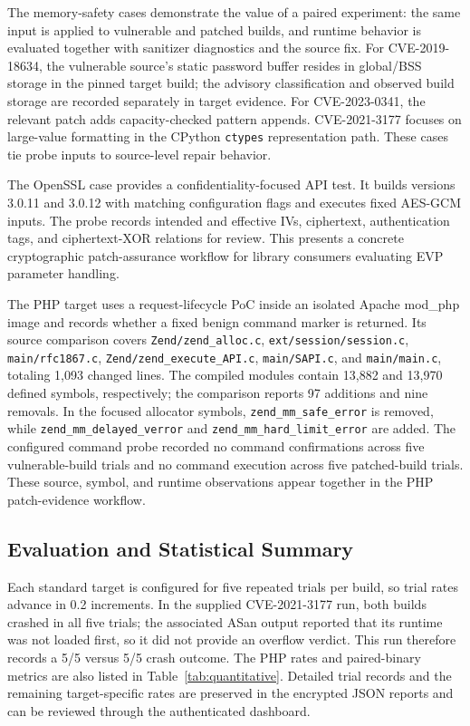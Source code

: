 \documentclass[conference]{IEEEtran}
\begin{document}
The memory-safety cases demonstrate the value of a paired experiment: the same input is applied to vulnerable and patched builds, and runtime behavior is evaluated together with sanitizer diagnostics and the source fix. For CVE-2019-18634, the vulnerable source's static password buffer resides in global/BSS storage in the pinned target build; the advisory classification and observed build storage are recorded separately in target evidence. For CVE-2023-0341, the relevant patch adds capacity-checked pattern appends. CVE-2021-3177 focuses on large-value formatting in the CPython \texttt{ctypes} representation path. These cases tie probe inputs to source-level repair behavior.

The OpenSSL case provides a confidentiality-focused API test. It builds versions 3.0.11 and 3.0.12 with matching configuration flags and executes fixed AES-GCM inputs. The probe records intended and effective IVs, ciphertext, authentication tags, and ciphertext-XOR relations for review. This presents a concrete cryptographic patch-assurance workflow for library consumers evaluating EVP parameter handling.

The PHP target uses a request-lifecycle PoC inside an isolated Apache mod\_php image and records whether a fixed benign command marker is returned. Its source comparison covers \texttt{Zend/zend\_alloc.c}, \texttt{ext/session/session.c}, \texttt{main/rfc1867.c}, \texttt{Zend/zend\_execute\_API.c}, \texttt{main/SAPI.c}, and \texttt{main/main.c}, totaling 1,093 changed lines. The compiled modules contain 13,882 and 13,970 defined symbols, respectively; the comparison reports 97 additions and nine removals. In the focused allocator symbols, \texttt{zend\_mm\_safe\_error} is removed, while \texttt{zend\_mm\_delayed\_verror} and \texttt{zend\_mm\_hard\_limit\_error} are added. The configured command probe recorded no command confirmations across five vulnerable-build trials and no command execution across five patched-build trials. These source, symbol, and runtime observations appear together in the PHP patch-evidence workflow.

\subsection{Evaluation and Statistical Summary}
Each standard target is configured for five repeated trials per build, so trial rates advance in 0.2 increments. In the supplied CVE-2021-3177 run, both builds crashed in all five trials; the associated ASan output reported that its runtime was not loaded first, so it did not provide an overflow verdict. This run therefore records a 5/5 versus 5/5 crash outcome. The PHP rates and paired-binary metrics are also listed in Table~\ref{tab:quantitative}. Detailed trial records and the remaining target-specific rates are preserved in the encrypted JSON reports and can be reviewed through the authenticated dashboard.
\end{document}
